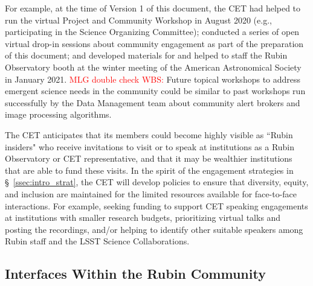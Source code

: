 \documentclass[DM,lsstdraft,toc]{lsstdoc}
\begin{document}
For example, at the time of Version 1 of this document, the CET had helped to run the virtual Project and Community Workshop in August 2020 (e.g., participating in the Science Organizing Committee); conducted a series of open virtual drop-in sessions about community engagement as part of the preparation of this document; and developed materials for and helped to staff the Rubin Observatory booth at the winter meeting of the American Astronomical Society in January 2021. 
\textcolor{red}{MLG double check WBS:} Future topical workshops to address emergent science needs in the community could be similar to past workshops run successfully by the Data Management team about community alert brokers and image processing algorithms. 

The CET anticipates that its members could become highly visible as ``Rubin insiders" who receive invitations to visit or to speak at institutions as a Rubin Observatory or CET representative, and that it may be wealthier institutions that are able to fund these visits.
In the spirit of the engagement strategies in \S~\ref{ssec:intro_strat}, the CET will develop policies to ensure that diversity, equity, and inclusion are maintained for the limited resources available for face-to-face interactions. 
For example, seeking funding to support CET speaking engagements at institutions with smaller research budgets, prioritizing virtual talks and posting the recordings, and/or helping to identify other suitable speakers among Rubin staff and the LSST Science Collaborations.


\subsection{Interfaces Within the Rubin Community}\label{ssec:mod_interface}
\end{document}
